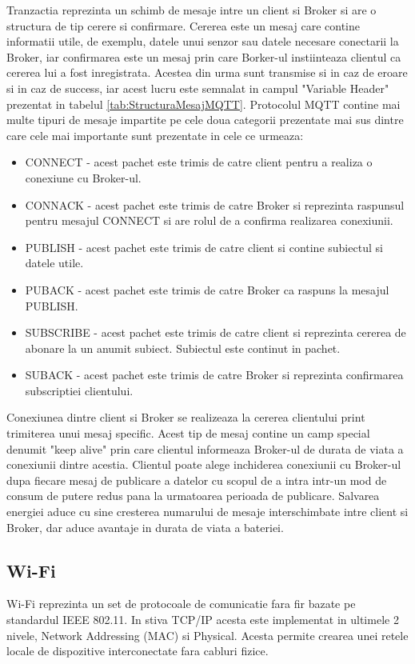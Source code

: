 Tranzactia reprezinta un schimb de mesaje intre un client si Broker si are o structura de tip cerere si confirmare. Cererea este un mesaj care contine informatii 
utile, de exemplu, datele unui senzor sau datele necesare conectarii la Broker, iar confirmarea este un mesaj prin care Borker-ul instiinteaza clientul ca cererea 
lui a fost inregistrata. Acestea din urma sunt transmise si in caz de eroare si in caz de success, iar acest lucru este semnalat in campul "Variable Header" 
prezentat in tabelul \ref{tab:StructuraMesajMQTT}. Protocolul MQTT contine mai multe tipuri de mesaje impartite pe cele doua categorii prezentate mai sus dintre 
care cele mai importante sunt prezentate in cele ce urmeaza:
\begin{itemize}
    \item CONNECT - acest pachet este trimis de catre client pentru a realiza o conexiune cu Broker-ul.
    \item CONNACK - acest pachet este trimis de catre Broker si reprezinta raspunsul pentru mesajul CONNECT si are rolul de a confirma realizarea conexiunii.
    \item PUBLISH - acest pachet este trimis de catre client si contine subiectul si datele utile.
    \item PUBACK - acest pachet este trimis de catre Broker ca raspuns la mesajul PUBLISH.
    \item SUBSCRIBE - acest pachet este trimis de catre client si reprezinta cererea de abonare la un anumit subiect. Subiectul este continut in pachet.
    \item SUBACK - acest pachet este trimis de catre Broker si reprezinta confirmarea subscriptiei clientului.
\end{itemize}

Conexiunea dintre client si Broker se realizeaza la cererea clientului print trimiterea unui mesaj specific. Acest tip de mesaj contine un camp special 
denumit "keep alive" prin care clientul informeaza Broker-ul de durata de viata a conexiunii dintre acestia. Clientul poate alege inchiderea conexiunii 
cu Broker-ul dupa fiecare mesaj de publicare a datelor cu scopul de a intra intr-un mod de consum de putere redus pana la urmatoarea perioada de 
publicare. Salvarea energiei aduce cu sine cresterea numarului de mesaje interschimbate intre client si Broker, dar aduce avantaje in durata de viata 
a bateriei. 

\subsection{Wi-Fi}\label{sec:wifi}
Wi-Fi reprezinta un set de protocoale de comunicatie fara fir bazate pe standardul IEEE 802.11. In stiva TCP/IP acesta este implementat in ultimele 2 nivele, 
Network Addressing (MAC) si Physical. Acesta permite crearea unei retele locale de dispozitive interconectate fara cabluri fizice.

